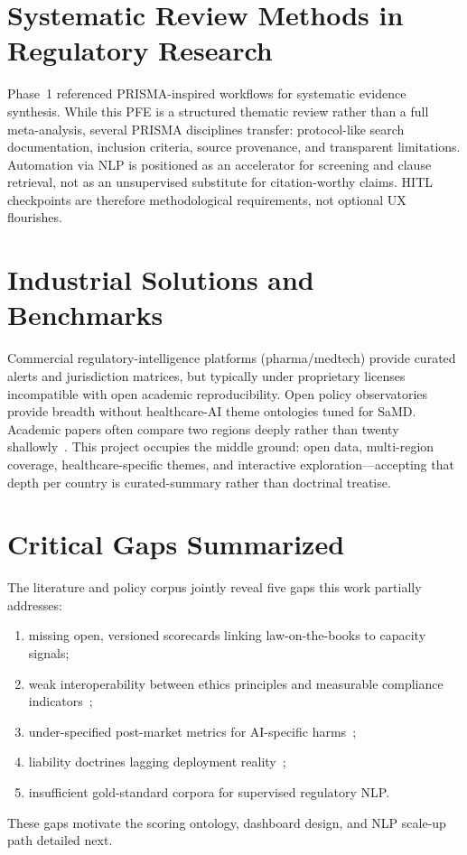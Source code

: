 \section{Systematic Review Methods in Regulatory Research}
\label{sec:prisma}

Phase~1 referenced PRISMA-inspired workflows for systematic evidence synthesis. While this PFE is a structured thematic review rather than a full meta-analysis, several PRISMA disciplines transfer: protocol-like search documentation, inclusion criteria, source provenance, and transparent limitations. Automation via NLP is positioned as an accelerator for screening and clause retrieval, not as an unsupervised substitute for citation-worthy claims. HITL checkpoints are therefore methodological requirements, not optional UX flourishes.

\section{Industrial Solutions and Benchmarks}
\label{sec:industrial}

Commercial regulatory-intelligence platforms (pharma/medtech) provide curated alerts and jurisdiction matrices, but typically under proprietary licenses incompatible with open academic reproducibility. Open policy observatories provide breadth without healthcare-AI theme ontologies tuned for SaMD. Academic papers often compare two regions deeply rather than twenty shallowly~\cite{muehlematter2021}. This project occupies the middle ground: open data, multi-region coverage, healthcare-specific themes, and interactive exploration---accepting that depth per country is curated-summary rather than doctrinal treatise.

\section{Critical Gaps Summarized}
\label{sec:gaps}

The literature and policy corpus jointly reveal five gaps this work partially addresses:
\begin{enumerate}[noitemsep]
  \item missing open, versioned scorecards linking law-on-the-books to capacity signals;
  \item weak interoperability between ethics principles and measurable compliance indicators~\cite{mittelstadt2019,morley2020};
  \item under-specified post-market metrics for AI-specific harms~\cite{petersen2022};
  \item liability doctrines lagging deployment reality~\cite{price2019};
  \item insufficient gold-standard corpora for supervised regulatory NLP.
\end{enumerate}
These gaps motivate the scoring ontology, dashboard design, and NLP scale-up path detailed next.

